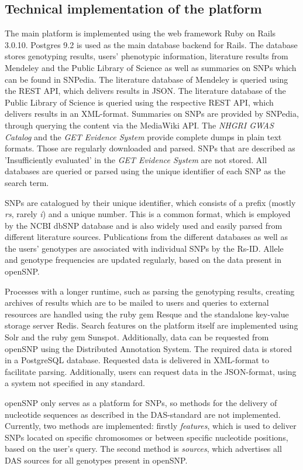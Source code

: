 \documentclass[10pt]{article}
\begin{document}
\subsection*{Technical implementation of the platform}
The main platform is implemented using the web framework Ruby on Rails 3.0.10. Postgres 9.2 is used as the main database backend for Rails. 
The database stores genotyping results, users' phenotypic information, literature results from Mendeley and the Public Library of Science as well as summaries on SNPs 
which can be found in SNPedia. The literature database of Mendeley is queried using the REST API, which delivers results in JSON. The literature database of 
the Public Library of Science is queried using the respective REST API, which delivers results in an XML-format. Summaries on SNPs are provided by SNPedia, 
through querying the content via the MediaWiki API. The \emph{NHGRI GWAS Catalog} and the \emph{GET Evidence System} provide complete dumps in plain text formats. Those are regularly downloaded and parsed. SNPs that are described as 'Insufficiently evaluated' in the \emph{GET Evidence System} are not stored. All databases are queried or parsed using the unique identifier of each SNP as the search term. 

SNPs are catalogued by their unique identifier, which consists of a prefix (mostly \textit{rs}, rarely \textit{i}) and a unique number. This is a common format, 
which is employed by the NCBI dbSNP database \cite{Sherry2001} and is also widely used and easily parsed from different literature sources. Publications from the different databases as 
well as the users' genotypes are associated with individual SNPs by the Rs-ID. Allele and genotype frequencies are updated regularly, based on the data present in openSNP. 

Processes with a longer runtime, such as parsing the genotyping results, creating archives of results which are to be mailed to users and queries to external resources 
are handled using the ruby gem Resque and the standalone key-value storage server Redis. Search features on the platform itself are implemented using Solr and the ruby gem Sunspot. 
Additionally, data can be requested from openSNP using the Distributed Annotation System. The required data is stored in a PostgreSQL database.  
Requested data is delivered in XML-format to facilitate parsing. Additionally, users can request data in the JSON-format, using a system not specified in any standard.

openSNP only serves as a platform for SNPs, so methods for the delivery of nucleotide sequences as described in the DAS-standard are not implemented. Currently, 
two methods are implemented: firstly \textit{features}, which is used to deliver SNPs located on specific chromosomes or between specific nucleotide positions, 
based on the user's query. The second method is \textit{sources}, which advertises all DAS sources for all genotypes present in openSNP.
\end{document}
